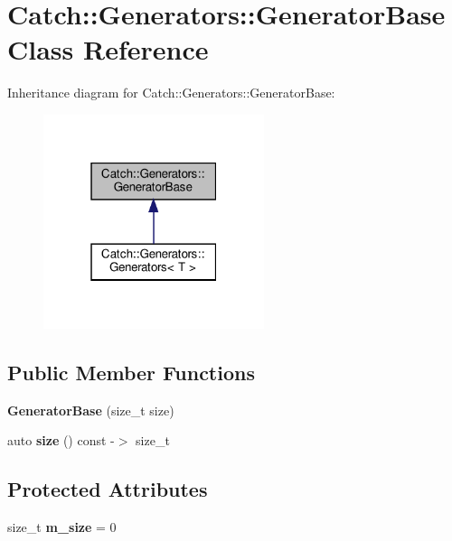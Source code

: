 \hypertarget{classCatch_1_1Generators_1_1GeneratorBase}{}\section{Catch\+::Generators\+::Generator\+Base Class Reference}
\label{classCatch_1_1Generators_1_1GeneratorBase}


Inheritance diagram for Catch\+::Generators\+::Generator\+Base\+:\nopagebreak
\begin{figure}[H]
\begin{center}
\leavevmode
\includegraphics[width=183pt]{classCatch_1_1Generators_1_1GeneratorBase__inherit__graph}
\end{center}
\end{figure}
\subsection*{Public Member Functions}
\begin{DoxyCompactItemize}
\item 
\mbox{\label{classCatch_1_1Generators_1_1GeneratorBase_ab003974d458a14acfb48f79e7e8abe21}} 
{\bfseries Generator\+Base} (size\+\_\+t size)
\item 
\mbox{\label{classCatch_1_1Generators_1_1GeneratorBase_a2fb4a5c153f3fdc2708245b40751b487}} 
auto {\bfseries size} () const -\/$>$ size\+\_\+t
\end{DoxyCompactItemize}
\subsection*{Protected Attributes}
\begin{DoxyCompactItemize}
\item 
\mbox{\label{classCatch_1_1Generators_1_1GeneratorBase_ac6ab90adfdda9401e2ea03db5b2dfc6a}} 
size\+\_\+t {\bfseries m\+\_\+size} = 0
\end{DoxyCompactItemize}


